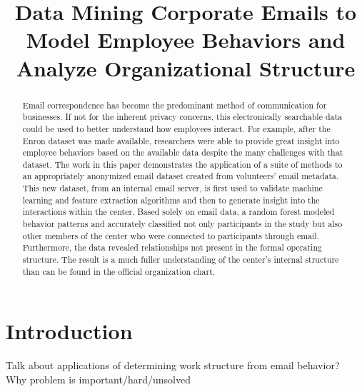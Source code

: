 \documentclass{article}
\begin{document}
\title{Data Mining Corporate Emails to Model Employee Behaviors and Analyze Organizational Structure}
\maketitle

\begin{abstract}
Email correspondence has become the predominant method of communication for businesses.  If not for the inherent privacy concerns, this electronically searchable data could be used to better understand how employees interact. For example, after the Enron dataset was made available, researchers were able to provide great insight into employee behaviors based on the available data despite the many challenges with that dataset.  The work in this paper demonstrates the application of a suite of methods to an appropriately anonymized email dataset created from volunteers' email metadata.  This new dataset, from an internal email server, is first used to validate machine learning and feature extraction algorithms and then to generate insight into the interactions within the center.  Based solely on email data, a random forest  modeled behavior patterns and accurately classified not only participants in the study but also other members of the center who were connected to participants through email.  Furthermore, the data revealed relationships not present in the formal operating structure.  The result is a much fuller understanding of the center's internal structure than can be found in the official organization chart.
\end{abstract}

\section{Introduction}
Talk about applications of determining work structure from email behavior? \\
Why problem is important/hard/unsolved\\
\end{document}
